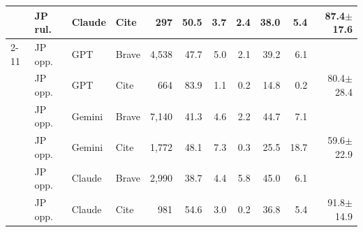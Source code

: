 \begin{table}[t]
\begin{tabular}{llllrrrrrrr}
 & JP rul. & Claude & Cite & 297 & 50.5 & 3.7 & 2.4 & 38.0 & 5.4 & 87.4$\pm$17.6 \\
\cmidrule(lr){2-11}
 & JP opp. & GPT & Brave & 4{,}538 & 47.7 & 5.0 & 2.1 & 39.2 & 6.1 &  \\
 & JP opp. & GPT & Cite & 664 & 83.9 & 1.1 & 0.2 & 14.8 & 0.2 & 80.4$\pm$28.4 \\
 & JP opp. & Gemini & Brave & 7{,}140 & 41.3 & 4.6 & 2.2 & 44.7 & 7.1 &  \\
 & JP opp. & Gemini & Cite & 1{,}772 & 48.1 & 7.3 & 0.3 & 25.5 & 18.7 & 59.6$\pm$22.9 \\
 & JP opp. & Claude & Brave & 2{,}990 & 38.7 & 4.4 & 5.8 & 45.0 & 6.1 &  \\
 & JP opp. & Claude & Cite & 981 & 54.6 & 3.0 & 0.2 & 36.8 & 5.4 & 91.8$\pm$14.9 \\
\bottomrule
\end{tabular}
\end{table}
